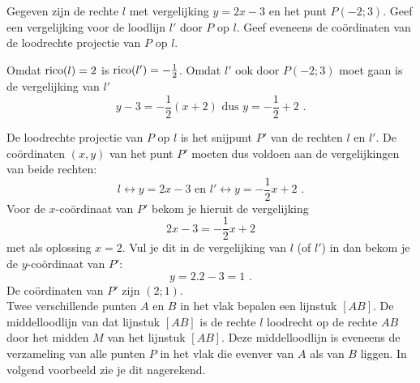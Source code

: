 \begin{voorbeeld}
	Gegeven zijn de rechte $l$ met vergelijking $y=2x-3$ en het punt $P(-2;3)$.
Geef een vergelijking voor de loodlijn $l'$ door $P$ op $l$.
Geef eveneens de co\"ordinaten van de loodrechte projectie van $P$ op $l$.

\begin{center}
	
\end{center}



Omdat $\operatorname{rico} (l)=2$ is $\operatorname{rico} (l')=-\frac{1}{2}$.
Omdat $l'$ ook door $P(-2;3)$ moet gaan is de vergelijking van $l'$
\[
y-3=-\frac{1}{2}(x+2) \text { dus } y=-\frac{1}{2}+2 \text { .}
\]

De loodrechte projectie van $P$ op $l$ is het snijpunt $P'$ van de rechten $l$ en $l'$.
De co\"ordinaten $(x,y)$ van het punt $P'$ moeten dus voldoen aan de vergelijkingen van beide rechten:
\[
l \leftrightarrow y=2x-3 \text { en } l' \leftrightarrow y=-\frac{1}{2}x+2 \text { .}
\]
Voor de $x$-co\"ordinaat van $P'$ bekom je hieruit de vergelijking
\[
2x-3=-\frac{1}{2}x+2
\]
met als oplossing $x=2$.
Vul je dit in de vergelijking van $l$ (of $l'$) in dan bekom je de $y$-co\"ordinaat van $P'$:
\[
y=2.2-3=1 \text { .}
\]
De co\"ordinaten van $P'$ zijn $(2;1)$.\\

Twee verschillende punten $A$ en $B$ in het vlak bepalen een lijnstuk $[AB]$.
De middelloodlijn van dat lijnstuk $[AB]$ is de rechte $l$ loodrecht op de rechte $AB$ door het midden $M$ van het lijnstuk $[AB]$.
Deze middelloodlijn is eveneens de verzameling van alle punten $P$ in het vlak die evenver van $A$ als van $B$ liggen.
In volgend voorbeeld zie je dit nagerekend.\\

\end{voorbeeld}

